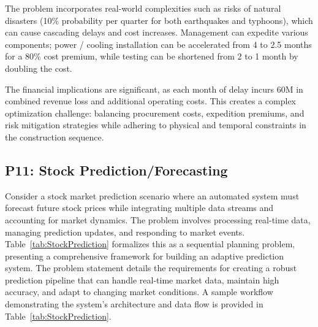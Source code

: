 The problem incorporates real-world complexities such as risks of natural disasters (10\% probability per quarter for both earthquakes and typhoons), which can cause cascading delays and cost increases. Management can expedite various components; power / cooling installation can be accelerated from 4 to 2.5 months for a 80\% cost premium, while testing can be shortened from 2 to 1 month by doubling the cost.

The financial implications are significant, as each month of delay incurs $60$M in combined revenue loss and additional operating costs. This creates a complex optimization challenge: balancing procurement costs, expedition premiums, and risk mitigation strategies while adhering to physical and temporal constraints in the construction sequence.

\subsection*{P11: Stock Prediction/Forecasting}
\label{sec:p11}

Consider a stock market prediction scenario where an automated system must forecast future stock prices while integrating multiple data streams and accounting for market dynamics. The problem involves processing real-time data, managing prediction updates, and responding to market events. Table~\ref{tab:StockPrediction} formalizes this as a sequential planning problem, presenting a comprehensive framework for building an adaptive prediction system. The problem statement details the requirements for creating a robust prediction pipeline that can handle real-time market data, maintain high accuracy, and adapt to changing market conditions. A sample workflow demonstrating the system's architecture and data flow is provided in Table~\ref{tab:StockPrediction}.




